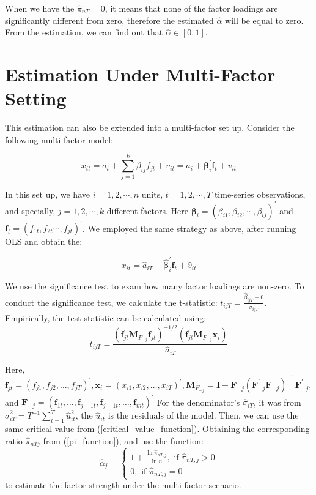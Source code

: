 When we have the $\hat{\pi}_{nT} = 0$, it means that none of the factor loadings are significantly different from zero, therefore the estimated $\hat{\alpha}$ will be equal to zero. 
From the estimation, we can find out that $\hat{\alpha} \in [0,1]$.

\section{Estimation Under Multi-Factor Setting}\label{strength_multi_estimation}

This estimation can also be extended into a multi-factor set up.
Consider the following multi-factor model:

\[x_{it} = a_i +\sum_{j = 1}^k\beta_{ij}f_{jt} +v_{it} = a_i + \bm{\beta}^{\prime}_{i}\bm{f}_{t} +v_{it} \tag{7} \label{multi_factor_model} \]

In this set up, we have $i = 1, 2, \cdots, n$ units, $t = 1, 2, \cdots, T$ time-series observations, and specially, $j = 1, 2,\cdots, k$ different factors.
Here $\bm{\beta}_{i} = (\beta_{i1}, \beta_{i2}, \cdots, \beta_{ij})^{\prime} $ and $\bm{f}_t = (f_{1t}, f_{2t}\cdots, f_{jt})^{\prime}$.
We employed the same strategy as above, after running OLS and obtain the:

\[ x_{it} =\hat{a}_{iT} + \bm{\hat{\beta}}^{\prime}_{i}\bm{f}_{t} + \hat{v}_{it}    \]

We use the significance test to exam how many factor loadings are non-zero.
To conduct the significance test, we calculate the t-statistic: $t_{ijT} = \frac{\hat{\beta}_{ijT}-0}{\hat{\sigma}_{ijT}}$. Empirically, the test statistic can be calculated using:
\[ t_{i j T}=\frac{\left(\bm{f}_{j t}^{\prime} \bm{M}_{F_{-j}} \bm{f}_{j t}\right)^{-1 / 2}\left(\bm{f}_{j t}^{\prime} \bm{M}_{F_{-j}} \bm{x}_{i}\right)}{\hat{\sigma}_{i T}} \]

Here, $\bm{f}_{j t}=\left(f_{j 1}, f_{j 2}, \ldots, f_{j T}\right)^{\prime}, \bm{x}_{i}=\left(x_{i 1}, x_{i 2}, \ldots, x_{i T}\right)^{\prime}, \bm{M}_{F_{-j}}=\bm{I}-\bm{F}_{-j}\left(\bm{F}_{-j}^{\prime} \bm{F}_{-j}\right)^{-1} \bm{F}_{-j}^{\prime}$, and $\bm{F}_{-j}=\left(\bm{f}_{1 t}, \ldots, \bm{f}_{j-1 t}, \bm{f}_{j+1 t}, \ldots, \bm{f}_{m t}\right)^{\prime}$
For the denominator's $\hat{\sigma}_{iT}$, it was from $\hat{\sigma}_{i T}^{2}=T^{-1} \sum_{t=1}^{T} \hat{u}_{i t}^{2}$, the $\hat{u}_{it}$ is the residuals of the model.
Then, we can use the same critical value from (\ref{critical_value_function}).
Obtaining the corresponding ratio $\hat{\pi}_{nTj}$  from (\ref{pi_function}), and use the function:
\begin{equation*}
\hat{\alpha}_{j}=\left\{\begin{array}{l}
1+\frac{\ln \hat{\pi}_{n T, j}}{\ln n}, \text { if } \hat{\pi}_{n T, j}>0 \\
0, \text { if } \hat{\pi}_{n T, j}=0
\end{array}\right.
\end{equation*}
to estimate the factor strength under the multi-factor scenario.
